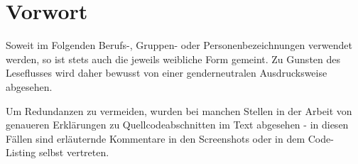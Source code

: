 \documentclass[
	12pt,
	BCOR=10mm,1
	headinclude=on,
	footinclude=off,
	parskip=half,
	bibliography=totoc,
	listof=entryprefix,
	toc=listof, 
	pointlessnumbers,
	plainfootsepline]{scrreprt}
\begin{document}


\normalfont


\chapter*{Vorwort}
Soweit im Folgenden Berufs-, Gruppen- oder Personenbezeichnungen verwendet werden, so ist stets auch die jeweils weibliche Form gemeint. Zu Gunsten des Leseflusses wird daher bewusst von einer genderneutralen Ausdrucksweise abgesehen.
\par
Um Redundanzen zu vermeiden, wurden bei manchen Stellen in der Arbeit von genaueren Erklärungen zu Quellcodeabschnitten im Text abgesehen - in diesen Fällen sind erläuternde Kommentare in den Screenshots oder in dem Code-Listing selbst vertreten.


\tableofcontents





%

\clearpage 
\ihead{\chaptername~\thechapter} %



\ihead{} %
\printbibliography	

\appendix
\ihead{\appendixname~\thechapter} %




\end{document}
